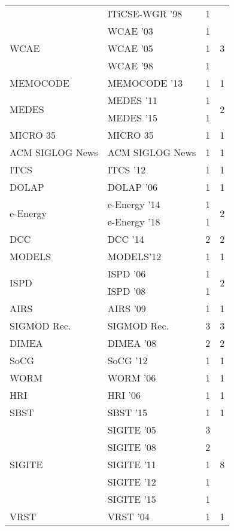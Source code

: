 \begin{table*}[t]
\begin{tabular}{llrr}
& ITiCSE-WGR '98 & 1 &\\
\multirow{3}{*}{WCAE } & WCAE '03 & 1 & \multirow{3}{*}{3}\\
& WCAE '05 & 1 &\\
& WCAE '98 & 1 &\\
\multirow{1}{*}{MEMOCODE } & MEMOCODE '13 & 1 & \multirow{1}{*}{1}\\
\multirow{2}{*}{MEDES } & MEDES '11 & 1 & \multirow{2}{*}{2}\\
& MEDES '15 & 1 &\\
\multirow{1}{*}{MICRO 35} & MICRO 35 & 1 & \multirow{1}{*}{1}\\
\multirow{1}{*}{ACM SIGLOG News} & ACM SIGLOG News & 1 & \multirow{1}{*}{1}\\
\multirow{1}{*}{ITCS } & ITCS '12 & 1 & \multirow{1}{*}{1}\\
\multirow{1}{*}{DOLAP } & DOLAP '06 & 1 & \multirow{1}{*}{1}\\
\multirow{2}{*}{e-Energy } & e-Energy '14 & 1 & \multirow{2}{*}{2}\\
& e-Energy '18 & 1 &\\
\multirow{1}{*}{DCC } & DCC '14 & 2 & \multirow{1}{*}{2}\\
\multirow{1}{*}{MODELS} & MODELS'12 & 1 & \multirow{1}{*}{1}\\
\multirow{2}{*}{ISPD } & ISPD '06 & 1 & \multirow{2}{*}{2}\\
& ISPD '08 & 1 &\\
\multirow{1}{*}{AIRS } & AIRS '09 & 1 & \multirow{1}{*}{1}\\
\multirow{1}{*}{SIGMOD Rec.} & SIGMOD Rec. & 3 & \multirow{1}{*}{3}\\
\multirow{1}{*}{DIMEA } & DIMEA '08 & 2 & \multirow{1}{*}{2}\\
\multirow{1}{*}{SoCG } & SoCG '12 & 1 & \multirow{1}{*}{1}\\
\multirow{1}{*}{WORM } & WORM '06 & 1 & \multirow{1}{*}{1}\\
\multirow{1}{*}{HRI } & HRI '06 & 1 & \multirow{1}{*}{1}\\
\multirow{1}{*}{SBST } & SBST '15 & 1 & \multirow{1}{*}{1}\\
\multirow{5}{*}{SIGITE } & SIGITE '05 & 3 & \multirow{5}{*}{8}\\
& SIGITE '08 & 2 &\\
& SIGITE '11 & 1 &\\
& SIGITE '12 & 1 &\\
& SIGITE '15 & 1 &\\
\multirow{1}{*}{VRST } & VRST '04 & 1 & \multirow{1}{*}{1}\\

\end{tabular}
\end{table*}
